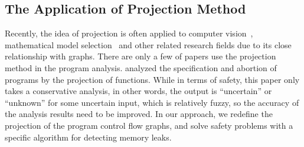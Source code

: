 \subsection{The Application of Projection Method}
Recently, the idea of projection is often applied to computer vision~\cite{DG14, HWS15}, mathematical model selection~\cite{NL10,ZYC17} and other related research fields due to its close relationship with graphs. There are only a few of papers use the projection method in the program analysis. \cite{D94} analyzed the specification and abortion of programs by the projection of functions. While in terms of safety, this paper only takes a conservative analysis, in other words, the output is ``uncertain” or ``unknown” for some uncertain input, which is relatively fuzzy, so the accuracy of the analysis results need to be improved. In our approach, we redefine the projection of the program control flow graphs, and solve safety problems with a specific algorithm for detecting memory leaks.
